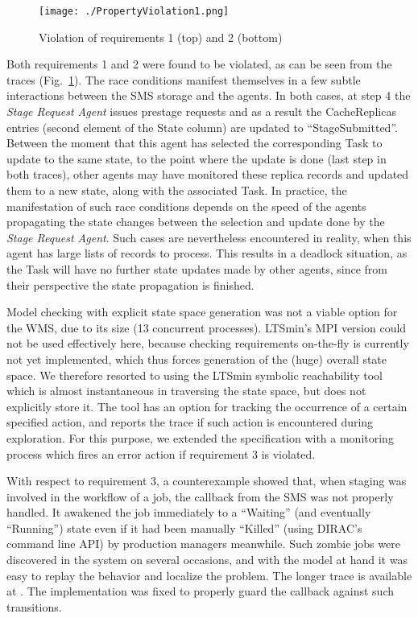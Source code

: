 \documentclass[10pt,conference]{IEEEtran}
\begin{document}
\begin{figure}[!bp]
\texttt{[image: ./PropertyViolation1.png]}
\centering
\vspace{-10 pt}
\caption{Violation of requirements 1 (top) and 2 (bottom)}
\vspace{-8 pt}
\label{fig:PropertyViolation}
\end{figure}
Both requirements 1 and 2 were found to be violated, as can be seen from the traces (Fig.~\ref{fig:PropertyViolation}).
The race conditions manifest themselves in a few subtle interactions between the SMS storage and the agents.
In both cases, at step 4 the \textit{Stage Request Agent} issues prestage requests and 
as a result the CacheReplicas entries (second element of the State column) are updated to ``StageSubmitted''. Between the moment
that this agent has selected the corresponding Task to update to the same state,
to the point where the update is done (last step in both traces),
other agents may have monitored these replica records and updated
them to a new state, along with the associated Task. In practice, the manifestation
of such race conditions depends on the speed of the agents propagating the
state changes between the selection and update done by the \textit{Stage Request Agent}.
Such cases are nevertheless encountered in reality, when this agent
has large lists of records to process. This results in a deadlock situation, as 
the Task will have no further state updates made by other agents, since
from their perspective the state propagation is finished.

Model checking with explicit state space generation was not a viable option for the WMS, due to its size (13 concurrent processes).
LTSmin's \cite{LTSmin} MPI version could not be used effectively here, because checking requirements on-the-fly
is currently not yet implemented, which thus forces generation of the (huge) overall state space.
We therefore resorted to using the LTSmin symbolic reachability tool which 
is almost instantaneous in traversing the state space, but does not
explicitly store it.
The tool has an option for tracking the occurrence of a certain specified action, and
reports the trace if such action is encountered during exploration. 
For this purpose, we extended the specification 
with a monitoring process which fires an error action if requirement 3 is
violated.

With respect to requirement 3, a counterexample showed that, when 
staging was involved in the workflow of a job, the callback from
the SMS was not properly handled.
It awakened the job immediately to a ``Waiting'' (and eventually ``Running'') state
even if it had been manually ``Killed'' 
(using DIRAC's command line API) by production managers meanwhile. Such zombie jobs
were discovered in the system on several occasions,
and with the model at hand it was easy to replay the behavior and localize the
problem. The longer trace is available at \cite{svn_mcrl2}. The implementation
was fixed to properly guard the callback against such transitions.
\end{document}
